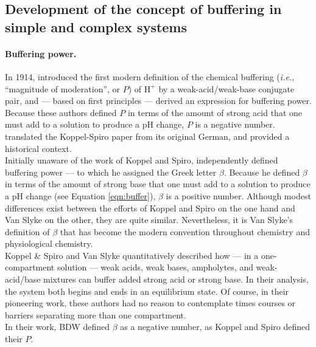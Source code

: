\documentclass[fleqn,10pt]{physiome}
\begin{document}
\subsection{Development of the concept of buffering in simple and complex systems}

\paragraph{Buffering power.} In 1914, \cite{koppel1914wirkung} introduced the first modern definition of the chemical buffering (\emph{i.e.}, ``magnitude of moderation'', or $P$) of $\mathrm{H^+}$ by a weak-acid/weak-base conjugate pair, and --- based on first principles --- derived an expression for buffering power. Because these authors defined $P$ in terms of the amount of strong acid that one must add to a solution to produce a $\mathrm{pH}$ change, $P$ is a negative number. \cite{roos1980buffer} translated the Koppel-Spiro paper from its original German, and provided a historical context.\\

Initially unaware of the work of Koppel and Spiro, \cite{van1922measurement} independently defined buffering power --- to which he assigned the Greek letter $\beta$. Because he defined $\beta$ in terms of the amount of strong base that one must add to a solution to produce a $\mathrm{pH}$ change (see Equation \ref{eqn:buffer}), $\beta$ is a positive number. Although modest differences exist between the efforts of Koppel and Spiro on the one hand and Van Slyke on the other, they are quite similar. Nevertheless, it is Van Slyke's definition of $\beta$ that has become the modern convention throughout chemistry and physiological chemistry.\\

Koppel \& Spiro and Van Slyke quantitatively described how --- in a one-compartment solution --- weak acids, weak bases, ampholytes, and weak-acid/base mixtures can buffer added strong acid or strong base. In their analysis, the system both begins and ends in an equilibrium state. Of course, in their pioneering work, these authors had no reason to contemplate times courses or barriers separating more than one compartment.\\

In their work, BDW defined $\beta$ as a negative number, as Koppel and Spiro defined their $P$.\\
\end{document}

